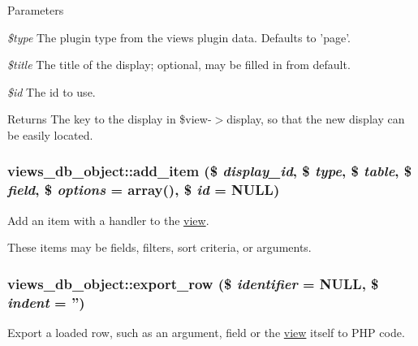 \begin{DoxyParams}{Parameters}
\item[{\em \$type}]The plugin type from the views plugin data. Defaults to 'page'. \item[{\em \$title}]The title of the display; optional, may be filled in from default. \item[{\em \$id}]The id to use. \end{DoxyParams}
\begin{DoxyReturn}{Returns}
The key to the display in \$view-\/$>$display, so that the new display can be easily located. 
\end{DoxyReturn}
\hypertarget{classviews__db__object_a794e8375c5d243e52645675b31251ccc}{
\subsubsection[{add\_\-item}]{\setlength{\rightskip}{0pt plus 5cm}views\_\-db\_\-object::add\_\-item (\$ {\em display\_\-id}, \/  \$ {\em type}, \/  \$ {\em table}, \/  \$ {\em field}, \/  \$ {\em options} = {\ttfamily array()}, \/  \$ {\em id} = {\ttfamily NULL})}}
\label{classviews__db__object_a794e8375c5d243e52645675b31251ccc}
Add an item with a handler to the \hyperlink{classview}{view}.

These items may be fields, filters, sort criteria, or arguments. \hypertarget{classviews__db__object_a0b0485d179ad553228534ae957e0ddc9}{
\subsubsection[{export\_\-row}]{\setlength{\rightskip}{0pt plus 5cm}views\_\-db\_\-object::export\_\-row (\$ {\em identifier} = {\ttfamily NULL}, \/  \$ {\em indent} = {\ttfamily ''})}}
\label{classviews__db__object_a0b0485d179ad553228534ae957e0ddc9}
Export a loaded row, such as an argument, field or the \hyperlink{classview}{view} itself to PHP code.


